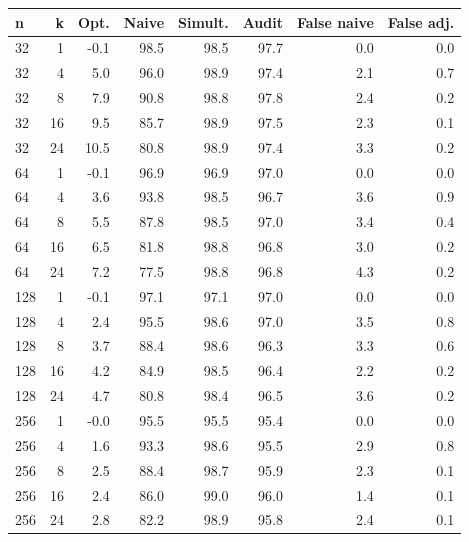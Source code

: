 \begin{tabular}{lrrrrrrr}
\toprule
n & k & Opt. & Naive & Simult. & Audit & False naive & False adj. \\
\midrule
32 & 1 & -0.1 & 98.5 & 98.5 & 97.7 & 0.0 & 0.0 \\
32 & 4 & 5.0 & 96.0 & 98.9 & 97.4 & 2.1 & 0.7 \\
32 & 8 & 7.9 & 90.8 & 98.8 & 97.8 & 2.4 & 0.2 \\
32 & 16 & 9.5 & 85.7 & 98.9 & 97.5 & 2.3 & 0.1 \\
32 & 24 & 10.5 & 80.8 & 98.9 & 97.4 & 3.3 & 0.2 \\
64 & 1 & -0.1 & 96.9 & 96.9 & 97.0 & 0.0 & 0.0 \\
64 & 4 & 3.6 & 93.8 & 98.5 & 96.7 & 3.6 & 0.9 \\
64 & 8 & 5.5 & 87.8 & 98.5 & 97.0 & 3.4 & 0.4 \\
64 & 16 & 6.5 & 81.8 & 98.8 & 96.8 & 3.0 & 0.2 \\
64 & 24 & 7.2 & 77.5 & 98.8 & 96.8 & 4.3 & 0.2 \\
128 & 1 & -0.1 & 97.1 & 97.1 & 97.0 & 0.0 & 0.0 \\
128 & 4 & 2.4 & 95.5 & 98.6 & 97.0 & 3.5 & 0.8 \\
128 & 8 & 3.7 & 88.4 & 98.6 & 96.3 & 3.3 & 0.6 \\
128 & 16 & 4.2 & 84.9 & 98.5 & 96.4 & 2.2 & 0.2 \\
128 & 24 & 4.7 & 80.8 & 98.4 & 96.5 & 3.6 & 0.2 \\
256 & 1 & -0.0 & 95.5 & 95.5 & 95.4 & 0.0 & 0.0 \\
256 & 4 & 1.6 & 93.3 & 98.6 & 95.5 & 2.9 & 0.8 \\
256 & 8 & 2.5 & 88.4 & 98.7 & 95.9 & 2.3 & 0.1 \\
256 & 16 & 2.4 & 86.0 & 99.0 & 96.0 & 1.4 & 0.1 \\
256 & 24 & 2.8 & 82.2 & 98.9 & 95.8 & 2.4 & 0.1 \\
\bottomrule
\end{tabular}
